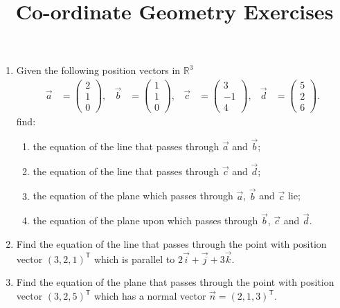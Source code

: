 \documentclass[a4paper,11pt]{article}
\title{Co-ordinate Geometry Exercises}
\begin{document}
\maketitle

\begin{enumerate}[label=4.\arabic*]
    \item Given the following position vectors in $\mathbb{R}^3$
    \begin{align*} 
        \vec{a} &= \begin{pmatrix} 2 \\ 1 \\ 0 \end{pmatrix}, &
        \vec{b} &= \begin{pmatrix} 1 \\ 1 \\ 0 \end{pmatrix}, &
        \vec{c} &= \begin{pmatrix} 3 \\ -1 \\ 4 \end{pmatrix}, &
        \vec{d} &= \begin{pmatrix} 5 \\ 2 \\ 6 \end{pmatrix}.
    \end{align*}
    find:
    \begin{enumerate}
        \item the equation of the line that passes through $\vec{a}$ and $\vec{b}$;
        \item the equation of the line that passes through $\vec{c}$ and $\vec{d}$;
        \item the equation of the plane which passes through $\vec{a}$, $\vec{b}$ and $\vec{c}$ lie;
        \item the equation of the plane upon which passes through $\vec{b}$, $\vec{c}$ and $\vec{d}$.
    \end{enumerate}

    \item Find the equation of the line that passes through the point with position vector $(3, 2, 1)^\mathsf{T}$ which is parallel to $2 \vec{i} + \vec{j} + 3 \vec{k}$.
    
    \item Find the equation of the plane that passes through the point with position vector $(3, 2, 5)^\mathsf{T}$ which has a normal vector $\vec{n} = (2, 1, 3)^\mathsf{T}$.
    

\end{enumerate}
\end{document}
